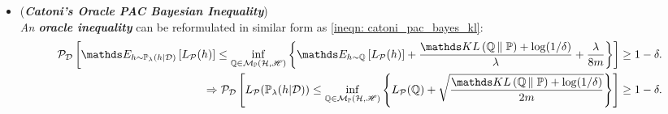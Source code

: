 \documentclass[11pt]{article}
\begin{document}
\begin{itemize}
\item \begin{remark} (\textbf{\emph{Catoni's Oracle PAC Bayesian Inequality}})\citep{catoni2003pac, alquier2021user}\\
\emph{An \textbf{oracle inequality}}  can be reformulated in similar form as \eqref{ineqn: catoni_pac_bayes_kl}:
\begin{align}
\cP_{\cD}\brac{ \E{h \sim \bP_{\lambda}(h|\cD)}{L_{\cP}(h)}  \le \inf_{\bQ \in \cM_{\bP}(\cH, \srH)}\set{\E{h \sim \bQ}{L_{\cP}(h)} + \frac{\kl{\bQ}{\bP}  + \log(1/\delta) }{\lambda} +  \frac{\lambda }{8m} }} \ge 1 - \delta. \label{ineqn: catoni_pac_bayes_kl_version_2}\\
\Rightarrow \cP_{\cD}\brac{L_{\cP}(\bP_{\lambda}(h|\cD)) \le \inf_{\bQ \in \cM_{\bP}(\cH, \srH)}\set{L_{\cP}(\bQ) + \sqrt{\frac{\kl{\bQ}{\bP}  + \log(1/\delta) }{2m}} }} \ge 1 - \delta. \nonumber
\end{align}
\end{remark}


\end{itemize}
\end{document}
